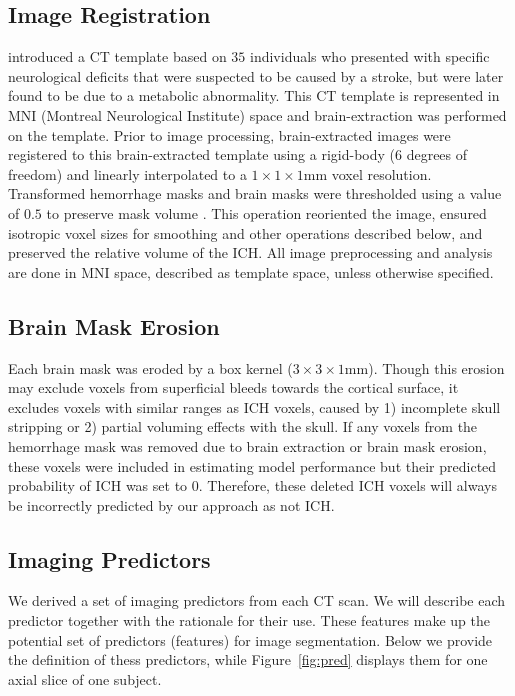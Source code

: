 \documentclass{elsarticle_nonatbib}\usepackage[]{graphicx}\usepackage[]{color}
\begin{document}
\subsection{Image Registration}
\citet{rorden_age-specific_2012} introduced a CT template based on $35$ individuals who presented with specific neurological deficits that were suspected to be caused by a stroke, but were later found to be due to a metabolic abnormality.  This CT template is represented in MNI (Montreal Neurological Institute) space and brain-extraction was performed on the template.  Prior to image processing, brain-extracted images were registered to this brain-extracted template using a rigid-body (6 degrees of freedom) and linearly interpolated to a $1\times1\times1$mm voxel resolution.  Transformed hemorrhage masks and brain masks were thresholded using a value of $0.5$ to preserve mask volume \cite{flirt_reg}. This operation reoriented the image, ensured isotropic voxel sizes for smoothing and other operations described below, and preserved the relative volume of the ICH.  All image preprocessing and analysis are done in MNI space, described as template space, unless otherwise specified.


\subsection{Brain Mask Erosion}
Each brain mask was eroded by a box kernel ($3\times3\times1$mm).  Though this erosion may exclude voxels from superficial bleeds towards the cortical surface, it excludes voxels with similar ranges as ICH voxels, caused by 1) incomplete skull stripping or 2) partial voluming effects with the skull.  If any voxels from the hemorrhage mask was removed due to brain extraction or brain mask erosion, these voxels were included in estimating model performance but their predicted probability of ICH was set to $0$.  Therefore, these deleted ICH voxels will always be incorrectly predicted by our approach as not ICH.  




\subsection{Imaging Predictors}
\label{sec:predictors}
We derived a set of imaging predictors from each CT scan.  We will describe each predictor together with the rationale for their use.  These features make up the potential set of predictors (features) for image segmentation.  Below we provide the definition of thess predictors, while Figure~\ref{fig:pred} displays them for one axial slice of one subject. 
\end{document}
